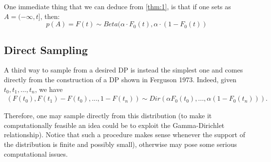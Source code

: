 \documentclass{article}
\begin{document}
One immediate thing that we can deduce from \ref{thm:1}, is that if one sets as $A = (-\infty, t]$, then:
\begin{equation}
\label{f(t)}
 p(A)=F(t)\sim Beta(\alpha\cdot F_0(t), \alpha\cdot(1-F_0(t)) 
\end{equation}

\subsection{Direct Sampling}
A third way to sample from a desired DP is instead the simplest one and comes directly from the construction of a DP shown in Ferguson 1973. Indeed, given $t_0,t_1,..., t_n$, we have
\begin{align*}
    (F(t_0), F(t_1)-F(t_0), ..., 1-F(t_n)) \sim Dir(\alpha F_0(t_0),..., \alpha (1-F_0(t_n)) ).
\end{align*}

Therefore, one may sample directly from this distribution (to make it computationally feasible an idea could be to exploit the Gamma-Dirichlet relationship). Notice that such a procedure makes sense whenever the support of the distribution is finite and possibly small), otherwise may pose some serious computational issues.
\end{document}

